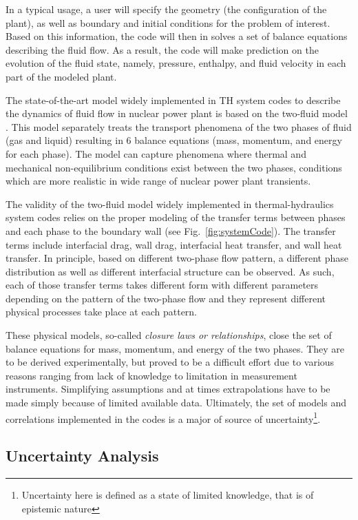 \documentclass[11pt,titlepage]{article}
\begin{document}
In a typical usage, a user will specify the geometry (the configuration of the plant), as well as boundary and initial conditions for the problem of interest.
Based on this information, the code will then in solves a set of balance equations describing the fluid flow.
As a result, the code will make prediction on the evolution of the fluid state, namely, pressure, enthalpy, and fluid velocity in each part of the modeled plant.

The state-of-the-art model widely implemented in TH system codes to describe the dynamics of fluid flow in nuclear power plant is based on the two-fluid model \cite{Ishii2011}.
This model separately treats the transport phenomena of the two phases of fluid (gas and liquid) resulting in 6 balance equations (mass, momentum, and energy for each phase).
The model can capture phenomena where thermal and mechanical non-equilibrium conditions exist between the two phases, conditions which are more realistic in wide range of nuclear power plant transients.

The validity of the two-fluid model widely implemented in thermal-hydraulics system codes relies on the proper modeling of the transfer terms between phases and each phase to the boundary wall (see Fig.~\ref{fig:systemCode}).
The transfer terms include interfacial drag, wall drag, interfacial heat transfer, and wall heat transfer.
In principle, based on different two-phase flow pattern, a different phase distribution as well as different interfacial structure can be observed.
As such, each of those transfer terms takes different form with different parameters depending on the pattern of the two-phase flow and they represent different physical processes take place at each pattern.
 
These physical models, so-called \emph{closure laws or relationships}, close the set of balance equations for mass, momentum, and energy of the two phases.
They are to be derived experimentally, but proved to be a difficult effort \cite{Nelson1992,Wulff2007} due to various reasons ranging from lack of knowledge to limitation in measurement instruments. 
Simplifying assumptions and at times extrapolations have to be made simply because of limited available data. 
Ultimately, the set of models and correlations implemented in the codes is a major of source of uncertainty\footnote{Uncertainty here is defined as a state of limited knowledge, that is of epistemic nature}.

\subsection{Uncertainty Analysis} 
\end{document}
